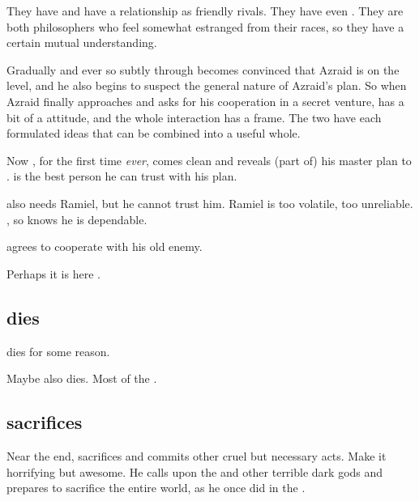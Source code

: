 They have  and have a relationship as friendly rivals. 
They have even . 
They are both philosophers who feel somewhat estranged from their races, so they have a certain mutual understanding. 

Gradually and ever so subtly through  \Ishnaruchaefir becomes convinced that Azraid is on the level, and he also begins to suspect the general nature of Azraid's plan. 
So when Azraid finally approaches \Ishnaruchaefir and asks for his cooperation in a secret venture, \Ishnaruchaefir has a bit of a  attitude, and the whole interaction has a  frame.
The two have each formulated ideas that can be combined into a useful whole.

Now \Azraid{}, for the first time \emph{ever}, comes clean and reveals (part of) his master plan to \Ishnaruchaefir. 
\Ishnaruchaefir{} is the best person he can trust with his plan. 

\Azraid{} also needs Ramiel, but he cannot trust him.
Ramiel is too volatile, too unreliable. 
\Ishnaruchaefir{} , so \Azraid{} knows he is dependable.

\Ishnaruchaefir{} agrees to cooperate with his old enemy. 

Perhaps it is here \Azraid{} . 








\subsection{\Harbeth dies}
\Harbeth dies for some reason. 

Maybe \Zereth also dies. 
Most of the . 








\subsection{\Ishnaruchaefir sacrifices \Criseis}
Near the end, \Ishnaruchaefir sacrifices \Criseis and commits other cruel but necessary acts. 
Make it horrifying but awesome. 
He calls upon the \xss and other terrible dark gods and prepares to sacrifice the entire world, as he once did in the . 


